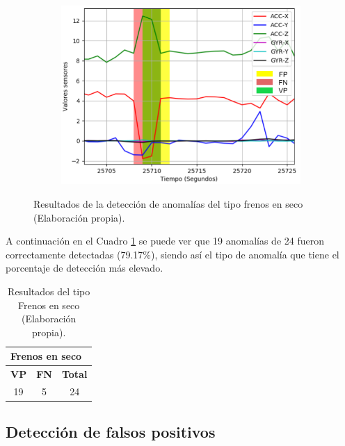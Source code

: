 \begin{figure}[H]
{\begin{varwidth}{\textwidth}
\begin{subfigure}[h]{0.45\textwidth}
            \includegraphics[width=\textwidth]{imagenes/Cap5/freno3}
        \end{subfigure} 
        \end{varwidth}}
        \caption{Resultados de la detecci\'{o}n de anomal\'{i}as del tipo frenos en seco (Elaboraci\'{o}n propia).}
		\label{fig:resultados_frenos}
    \end{figure}

A continuaci\'{o}n en el Cuadro \ref{table:frenos_resultado} se puede ver que 19 anomal\'{i}as de 24 fueron correctamente detectadas (79.17\%), siendo as\'{i} el tipo de anomal\'{i}a que tiene el porcentaje de detecci\'{o}n m\'{a}s elevado.

\begin{table}[H]
\centering
\begin{center}
\begin{tabular}{|c|c|c|}
\hline
\multicolumn{3}{|l|}{\textbf{Frenos en seco}} \\ \hline
\textbf{VP}   & \textbf{FN}   & \textbf{Total}  \\ \hline
\cellcolor[HTML]{AADD99}19  & \cellcolor[HTML]{DF9F9F}5  & 24             \\ \hline
\end{tabular}
\caption{Resultados del tipo Frenos en seco (Elaboraci\'{o}n propia).}
\label{table:frenos_resultado}
\end{center}
\end{table}

\subsection{Detecci\'{o}n de falsos positivos}


